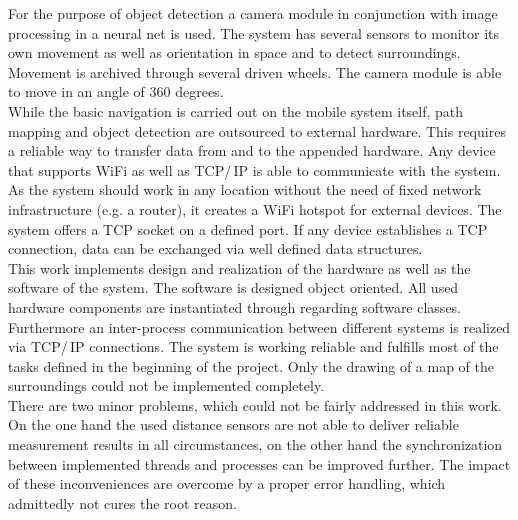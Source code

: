 \documentclass[a4paper,12pt,oneside]{article}
\begin{document}
For the purpose of object detection a camera module in conjunction with image processing in a neural net is used. The system has several sensors to monitor its own movement as well as orientation in space and to detect surroundings. Movement is archived through several driven wheels. The camera module is able to move in an angle of 360 degrees.\\

While the basic navigation is carried out on the mobile system itself, path mapping and object detection are outsourced to external hardware. This requires a reliable way to transfer data from and to the appended hardware. Any device that supports WiFi as well as TCP/\,IP is able to communicate with the system. As the system should work in any location without the need of fixed network infrastructure (e.g. a router), it creates a WiFi hotspot for external devices. The system offers a TCP socket on a defined port. If any device establishes a TCP connection, data can be exchanged via well defined data structures.\\

This work implements design and realization of the hardware as well as the software of the system. The software is designed object oriented. All used hardware components are instantiated through regarding software classes. Furthermore an inter-process communication between different systems is realized via TCP/\,IP connections. The system is working reliable and fulfills most of the tasks defined in the beginning of the project. Only the drawing of a map of the surroundings could not be implemented completely.\\

There are two minor problems, which could not be fairly addressed in this work. On the one hand the used distance sensors are not able to deliver reliable measurement results in all circumstances, on the other hand the synchronization between implemented threads and processes can be improved further. The impact of these inconveniences are overcome by a proper error handling, which admittedly not cures the root reason.

\newpage
\cleardoublepage
\pagestyle{TOC}
\tableofcontents

\newpage
\listoffigures

\newpage
\listoftables








\end{document}
